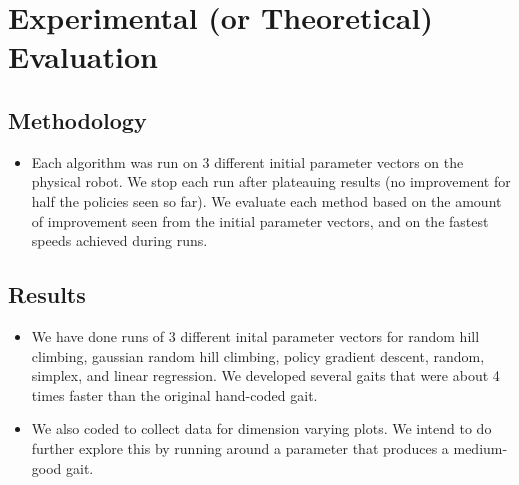 \section{Experimental (or Theoretical) Evaluation}

\subsection{Methodology}
\begin{itemize}
\item Each algorithm was run on 3 different initial parameter vectors on the
physical robot. We stop each run after plateauing results (no improvement 
for half the policies seen so far). We evaluate each method based on the
amount of improvement seen from the initial parameter vectors, and on the
fastest speeds achieved during runs.
\end{itemize}

\subsection{Results}
\begin{itemize}
\item We have done runs of 
3 different inital parameter vectors for random hill climbing, 
gaussian random hill climbing, policy gradient descent, random,
simplex, and linear regression. We developed several
gaits that were about 4 times faster than the original hand-coded gait. 

\item We also coded  to collect data for dimension
varying plots. We intend to do further explore this by running
 around a parameter that produces a medium-good gait.
\end{itemize}

